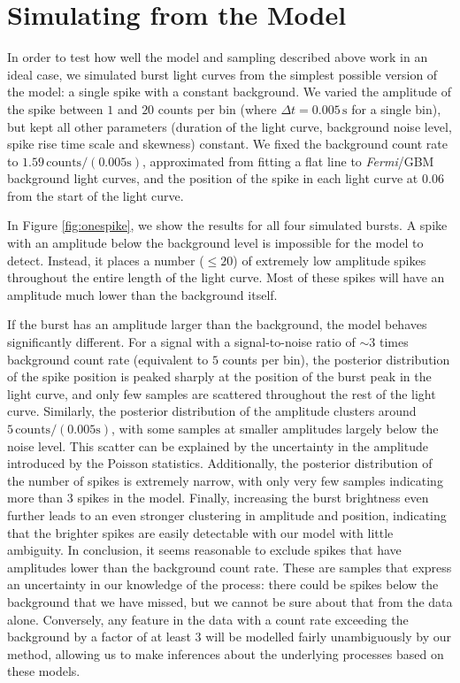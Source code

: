 \documentclass[12pt]{emulateapj}
\newcommand{\project}[1]{\textsl{#1}}
\newcommand{\fermi}{\project{Fermi}}
\begin{document}
\section{Simulating from the Model}
\label{ch6:modelsims}

In order to test how well the model and sampling described above work in an ideal case, we simulated burst light curves from the simplest possible version
of the model: a single spike with a constant background. We varied the amplitude of the spike between $1$ and $20$ counts per bin (where $\Delta t = 0.005\,\mathrm{s}$ for
a single bin), but kept all other parameters (duration of the light curve, background noise level, spike rise time scale and skewness) constant. 
We fixed the background count rate to $1.59\,\mathrm{counts}/(0.005\mathrm{s})$, approximated from fitting a flat line to \fermi/GBM background light curves, and the position
of the spike in each light curve at $0.06$ from the start of the light curve.

In Figure \ref{fig:onespike}, we show the results for all four simulated bursts. A spike with an amplitude below the background level is impossible for the model
to detect. Instead, it places a number ($\leq 20$) of extremely low amplitude spikes throughout the entire length of the light curve. Most of these spikes will have an amplitude
much lower than the background itself. 

If the burst has an amplitude larger than the background, the model behaves significantly different. For a signal with a signal-to-noise ratio of $\sim 3$ times background count rate (equivalent to $5$ counts per bin), the posterior distribution of the spike position is peaked sharply at the position of the burst peak in the light curve, 
and only few samples are scattered throughout the rest of the light curve. Similarly, the posterior distribution of the amplitude clusters around $5 \,\mathrm{counts}/(0.005\mathrm{s})$, with some samples at 
smaller amplitudes largely below the noise level. This scatter can be explained by the uncertainty in the amplitude introduced by the Poisson statistics. Additionally, the posterior distribution of the
number of spikes is extremely narrow, with only very few samples indicating more than $3$ spikes in the model. 
Finally, increasing the burst brightness even further leads to an even stronger clustering in amplitude and position, indicating that the brighter spikes are easily detectable with our model 
with little ambiguity. 
In conclusion, it seems reasonable to exclude spikes that have amplitudes lower than the background count rate. These are samples that express an uncertainty in our knowledge of 
the process: there could be spikes below the background that we have missed, but we cannot be sure about that from the data alone. Conversely, any feature in the data with a count
rate exceeding the background by a factor of at least $3$ will be modelled fairly unambiguously by our method, allowing us to make inferences about the underlying processes based on
these models.
\end{document}
